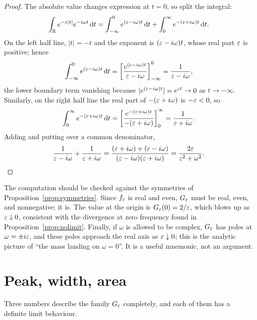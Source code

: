 \begin{proof}
The absolute value changes expression at $t=0$, so split the integral:
\begin{equation}
\int_{\mathbb{R}}e^{-\varepsilon|t|}e^{-i\omega t}\,\mathrm{d} t
=\int_{-\infty}^{0}e^{(\varepsilon-i\omega)t}\,\mathrm{d} t+\int_{0}^{\infty}e^{-(\varepsilon+i\omega)t}\,\mathrm{d} t .
\end{equation}
On the left half line, $|t|=-t$ and the exponent is $(\varepsilon-i\omega)t$, whose real part $\varepsilon$ is
positive; hence
\begin{equation}
\int_{-\infty}^{0}e^{(\varepsilon-i\omega)t}\,\mathrm{d} t
=\left[\frac{e^{(\varepsilon-i\omega)t}}{\varepsilon-i\omega}\right]_{-\infty}^{0}
=\frac{1}{\varepsilon-i\omega},
\end{equation}
the lower boundary term vanishing because $|e^{(\varepsilon-i\omega)t}|=e^{\varepsilon t}\to0$ as $t\to-\infty$.
Similarly, on the right half line the real part of $-(\varepsilon+i\omega)$ is $-\varepsilon<0$, so
\begin{equation}
\int_{0}^{\infty}e^{-(\varepsilon+i\omega)t}\,\mathrm{d} t
=\left[\frac{e^{-(\varepsilon+i\omega)t}}{-(\varepsilon+i\omega)}\right]_{0}^{\infty}
=\frac{1}{\varepsilon+i\omega}.
\end{equation}
Adding and putting over a common denominator,
\begin{equation}
\frac{1}{\varepsilon-i\omega}+\frac{1}{\varepsilon+i\omega}
=\frac{(\varepsilon+i\omega)+(\varepsilon-i\omega)}{(\varepsilon-i\omega)(\varepsilon+i\omega)}
=\frac{2\varepsilon}{\varepsilon^{2}+\omega^{2}}. \qedhere
\end{equation}
\end{proof}

\begin{remark}
The computation should be checked against the symmetries of Proposition~\ref{prop:symmetries}.
Since $f_{\varepsilon}$ is real and even, $G_{\varepsilon}$ must be real, even, and nonnegative; it is. The value
at the origin is $G_{\varepsilon}(0)=2/\varepsilon$, which blows up as $\varepsilon\downarrow0$, consistent with the
divergence at zero frequency found in Proposition~\ref{prop:nolimit}. Finally, if $\omega$ is
allowed to be complex, $G_{\varepsilon}$ has poles at $\omega=\pm i\varepsilon$, and these poles approach the real
axis as $\varepsilon\downarrow0$; this is the analytic picture of ``the mass landing on $\omega=0$''. It is
a useful mnemonic, not an argument.
\end{remark}

\section{Peak, width, area}

Three numbers describe the family $G_{\varepsilon}$ completely, and each of them has a definite limit
behaviour.

